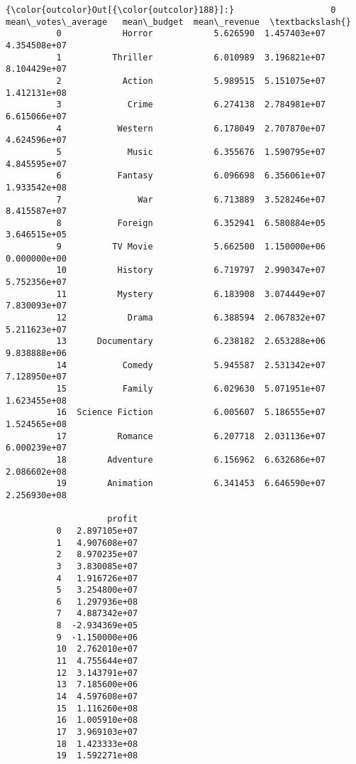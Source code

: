\documentclass[11pt]{article}
\begin{document}
\begin{Verbatim}[commandchars=\\\{\}]
{\color{outcolor}Out[{\color{outcolor}188}]:}                   0  mean\_votes\_average   mean\_budget  mean\_revenue  \textbackslash{}
          0            Horror            5.626590  1.457403e+07  4.354508e+07   
          1          Thriller            6.010989  3.196821e+07  8.104429e+07   
          2            Action            5.989515  5.151075e+07  1.412131e+08   
          3             Crime            6.274138  2.784981e+07  6.615066e+07   
          4           Western            6.178049  2.707870e+07  4.624596e+07   
          5             Music            6.355676  1.590795e+07  4.845595e+07   
          6           Fantasy            6.096698  6.356061e+07  1.933542e+08   
          7               War            6.713889  3.528246e+07  8.415587e+07   
          8           Foreign            6.352941  6.580884e+05  3.646515e+05   
          9          TV Movie            5.662500  1.150000e+06  0.000000e+00   
          10          History            6.719797  2.990347e+07  5.752356e+07   
          11          Mystery            6.183908  3.074449e+07  7.830093e+07   
          12            Drama            6.388594  2.067832e+07  5.211623e+07   
          13      Documentary            6.238182  2.653288e+06  9.838888e+06   
          14           Comedy            5.945587  2.531342e+07  7.128950e+07   
          15           Family            6.029630  5.071951e+07  1.623455e+08   
          16  Science Fiction            6.005607  5.186555e+07  1.524565e+08   
          17          Romance            6.207718  2.031136e+07  6.000239e+07   
          18        Adventure            6.156962  6.632686e+07  2.086602e+08   
          19        Animation            6.341453  6.646590e+07  2.256930e+08   
          
                    profit  
          0   2.897105e+07  
          1   4.907608e+07  
          2   8.970235e+07  
          3   3.830085e+07  
          4   1.916726e+07  
          5   3.254800e+07  
          6   1.297936e+08  
          7   4.887342e+07  
          8  -2.934369e+05  
          9  -1.150000e+06  
          10  2.762010e+07  
          11  4.755644e+07  
          12  3.143791e+07  
          13  7.185600e+06  
          14  4.597608e+07  
          15  1.116260e+08  
          16  1.005910e+08  
          17  3.969103e+07  
          18  1.423333e+08  
          19  1.592271e+08  
\end{Verbatim}
            
\end{document}
